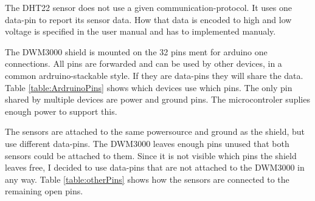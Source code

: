 The DHT22 sensor does not use a given communication-protocol.
It uses one data-pin to report its sensor data.
How that data is encoded to high and low voltage is specified in the user manual \cite{AM2302} and has to implemented manualy.

The DWM3000 shield is mounted on the 32 pins ment for arduino one connections. 
All pins are forwarded and can be used by other devices, in a common ardruino-stackable style.
If they are data-pins they will share the data.
Table \ref{table:ArdruinoPins} shows which devices use which pins.
The only pin shared by multiple devices are power and ground pins.
The microcontroler suplies enough power to support this.

The sensors are attached to the same powersource and ground as the shield, but use different data-pins.
The DWM3000 leaves enough pins unused that both sensors could be attached to them.
Since it is not visible which pins the shield leaves free, I decided to use data-pins that are not attached to the DWM3000 in any way.
Table \ref{table:otherPins} shows how the sensors are connected to the remaining open pins.

